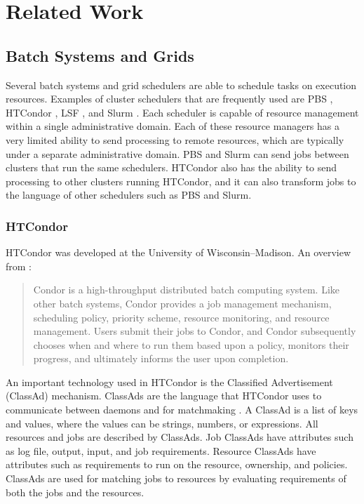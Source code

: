 \chapter{Related Work}
\label{chapter:relatedwork}

\section{Batch Systems and Grids}


Several batch systems and grid schedulers are able to schedule tasks on execution resources.  Examples of cluster schedulers that are frequently used are PBS \cite{pbstorque}, \mbox{HTCondor} \cite{litzkow1988condor}, LSF \cite{computinglsf},  and Slurm \cite{yoo2003slurm}.  Each scheduler is capable of resource management within a single administrative domain.  Each of these resource managers has a very limited ability to send processing to remote resources, which are typically under a separate administrative domain.  PBS and Slurm can send jobs between clusters that run the same schedulers.  HTCondor also has the ability to send processing to other clusters running HTCondor, and it can also transform jobs to the language of other schedulers such as PBS and Slurm.

\subsection{HTCondor}
HTCondor was developed at the University of Wisconsin--Madison.  An overview from \cite{thain2005distributed}:
\begin{quotation}
	Condor is a high-throughput distributed batch computing system.  Like other batch systems, Condor provides a job management mechanism, scheduling policy, priority scheme, resource monitoring, and resource management.  Users submit their jobs to Condor, and Condor subsequently chooses when and where to run them based upon a policy, monitors their progress, and ultimately informs the user upon completion.  
\end{quotation}

An important technology used in HTCondor is the Classified Advertisement (\mbox{ClassAd}) mechanism.  ClassAds are the language that HTCondor uses to communicate between daemons and for matchmaking \cite{raman1998matchmaking}.  A ClassAd is a list of keys and values, where the values can be strings, numbers, or expressions.  All resources and jobs are described by ClassAds.  Job ClassAds have attributes such as log file, output, input, and job requirements.  Resource ClassAds have attributes such as  requirements to run on the resource, ownership, and policies.  ClassAds are used for matching jobs to resources by evaluating requirements of both the jobs and the resources.

